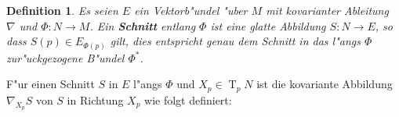\documentclass[paper=A4, twoside, chapterprefix=true, bibliography=totoc, headsepline]{scrbook}
\DeclareMathOperator{\T}{T} %
\theoremstyle{plain}
\newtheorem{Dfn}{Definition}[chapter]
\theoremstyle{nonumberplain}
\theoremstyle{empty}
\theoremstyle{break}
\newcommand{\CmIndex}[2][]{\ifthenelse{\isempty{#1}}{\index{#2}}{\index{#1}}#2}
\newcommand{\CmMark}[2][]{\textbf{\CmIndex[#1]{#2}}}
\begin{document}
\begin{Dfn}
  Es seien $E$ ein Vektorb"undel "uber $M$ mit kovarianter Ableitung $\nabla$ und $\Phi: N \to M$.
  Ein \CmMark{Schnitt} entlang $\Phi$ ist eine glatte Abbildung $S: N \to E$, so dass $S(p) \in E_{\Phi(p)}$ gilt, dies entspricht genau dem Schnitt in das l"angs $\Phi$ zur"uckgezogene B"undel $\Phi^*$.
  \begin{center}\end{center}
\end{Dfn}
F"ur einen Schnitt $S$ in $E$ l"angs $\Phi$ und $X_p \in \T_pN$ ist die kovariante Abbildung $\nabla_{X_p}S$ von $S$ in Richtung $X_p$ wie folgt definiert:
\end{document}

